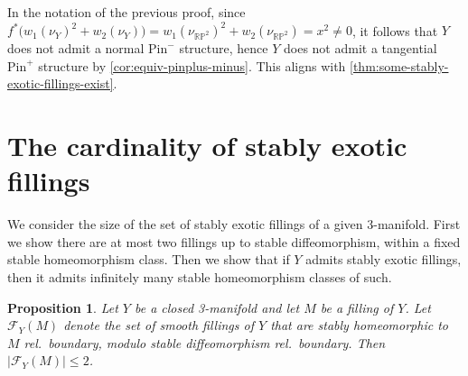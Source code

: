 \documentclass[a4paper, reqno]{amsart}
\newtheorem{proposition}{Proposition}[section]
\theoremstyle{definition}
\theoremstyle{remark}
\newcommand{\pinplus}{{\mathrm{Pin}^+}\!}
\newcommand{\pinminus}{{\mathrm{Pin}^-}}
\newcommand{\RP}{\mathbb{RP}}
\begin{document}
In the notation of the previous proof, since $f^*\big(w_1(\nu_Y)^2 + w_2(\nu_Y)\big) = w_1(\nu_{\RP^2})^2 + w_2(\nu_{\RP^2}) = x^2 \neq 0$, it follows that $Y$ does not admit a normal $\pinminus$ structure, hence $Y$ does not admit a tangential $\pinplus$ structure by \cref{cor:equiv-pinplus-minus}. This aligns with \cref{thm:some-stably-exotic-fillings-exist}. 

\section{The cardinality of stably exotic fillings}\label{sec:number-fillings}

We consider the size of the set of stably exotic fillings of a given 3-manifold. First we show there are at most two fillings up to stable diffeomorphism, within a fixed stable homeomorphism class. Then we show that if $Y$ admits stably exotic fillings, then it admits infinitely many stable homeomorphism classes of such. 

\begin{proposition}\label{prop-at-most-two} 
Let $Y$ be a closed 3-manifold and let $M$ be a filling of $Y$. Let $\mathcal{F}_Y(M)$ denote the set of smooth fillings of $Y$ that are stably homeomorphic to $M$ rel.\ boundary,  modulo stable diffeomorphism rel.\ boundary. Then $|\mathcal{F}_Y(M)| \leq 2$.
\end{proposition}
\end{document}
